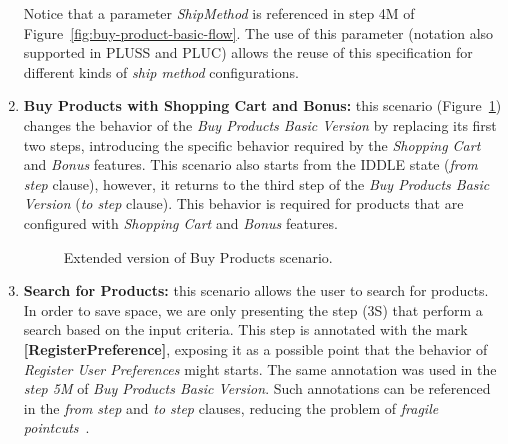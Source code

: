 \begin{enumerate}
 Notice that a parameter \emph{ShipMethod} is referenced in step 4M of Figure~\ref{fig:buy-product-basic-flow}. The use of this parameter (notation also supported in PLUSS and PLUC) allows the reuse of this specification 
for different kinds of \emph{ship method} configurations.


\item {\bf Buy Products with Shopping Cart and Bonus:} this scenario (Figure~\ref{fig:buy-product-changing-flow}) changes the behavior of 
the \emph{Buy Products Basic Version} by replacing its first two steps, introducing the specific behavior required by the \emph{Shopping Cart} and 
\emph{Bonus} features. This scenario also starts from the IDDLE state (\emph{from step} clause), however, it returns to the third step of the \emph{Buy 
Products Basic Version} (\emph{to step} clause). This behavior is required for products that are configured with \emph{Shopping Cart} and \emph{Bonus} features.

\begin{figure}[h]
\caption{Extended version of Buy Products scenario.}
\label{fig:buy-product-changing-flow}
\end{figure}

\item {\bf Search for Products:} this scenario allows the user to search for products. In order to save space, we are only presenting the step (3S) that 
perform a search based on the input criteria. This step is annotated with the mark \mbox{{\bf [RegisterPreference]}}, exposing it as a possible point that the 
behavior of \emph{Register User Preferences} might starts. The same annotation was used in the \emph{step 5M} of \emph{Buy Products Basic Version}. Such 
annotations can be referenced in the \emph{from step} and \emph{to step} clauses, reducing 
the problem of \emph{fragile pointcuts}~\cite{rashid-aosd-2007}.


\end{enumerate}
